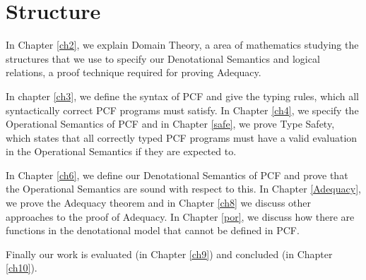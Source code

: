 \section{Structure}
In Chapter \ref{ch2}, we explain Domain Theory, a area of mathematics studying the structures that we use to specify our Denotational Semantics and logical relations, a proof technique required for proving Adequacy.

In chapter \ref{ch3}, we define the syntax of PCF and give the typing rules, which all syntactically correct PCF programs must satisfy. In Chapter \ref{ch4}, we specify the Operational  Semantics of PCF and in Chapter \ref{safe}, we prove Type Safety, which states that all correctly typed PCF programs must have a valid evaluation in the Operational Semantics if they are expected to.

In Chapter \ref{ch6}, we define our Denotational Semantics of PCF and prove that the Operational Semantics are sound with respect to this. In Chapter \ref{Adequacy}, we prove the Adequacy theorem and in Chapter \ref{ch8} we discuss other approaches to the proof of Adequacy. In Chapter \ref{por}, we discuss how there are functions in the denotational model that cannot be defined in PCF.

Finally our work is evaluated (in Chapter \ref{ch9}) and concluded (in Chapter \ref{ch10}).

